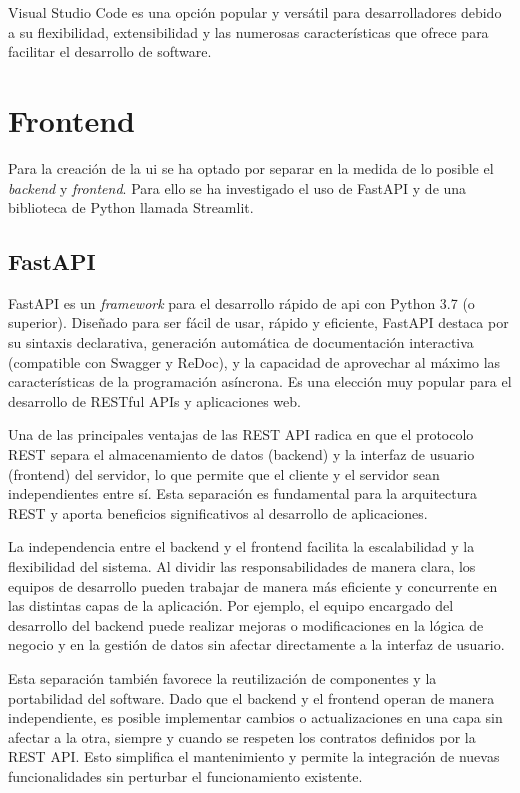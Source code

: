 Visual Studio Code es una opción popular y versátil para desarrolladores debido a su flexibilidad, extensibilidad y las numerosas características que ofrece para facilitar el desarrollo de software.

\section{Frontend}

Para la creación de la \acrshort{ui} se ha optado por separar en la medida de lo posible el \textit{backend} y \textit{frontend}. Para ello se ha investigado el uso de FastAPI y de una biblioteca de Python llamada Streamlit.

\subsection{FastAPI}

FastAPI es un \textit{framework} para el desarrollo rápido de \acrshort{api} con Python 3.7 (o superior). Diseñado para ser fácil de usar, rápido y eficiente, FastAPI destaca por su sintaxis declarativa, generación automática de documentación interactiva (compatible con Swagger y ReDoc), y la capacidad de aprovechar al máximo las características de la programación asíncrona. Es una elección muy popular para el desarrollo de RESTful APIs y aplicaciones web.

Una de las principales ventajas de las REST API radica en que el protocolo REST separa el almacenamiento de datos (backend) y la interfaz de usuario (frontend) del servidor, lo que permite que el cliente y el servidor sean independientes entre sí. Esta separación es fundamental para la arquitectura REST y aporta beneficios significativos al desarrollo de aplicaciones.

La independencia entre el backend y el frontend facilita la escalabilidad y la flexibilidad del sistema. Al dividir las responsabilidades de manera clara, los equipos de desarrollo pueden trabajar de manera más eficiente y concurrente en las distintas capas de la aplicación. Por ejemplo, el equipo encargado del desarrollo del backend puede realizar mejoras o modificaciones en la lógica de negocio y en la gestión de datos sin afectar directamente a la interfaz de usuario.

Esta separación también favorece la reutilización de componentes y la portabilidad del software. Dado que el backend y el frontend operan de manera independiente, es posible implementar cambios o actualizaciones en una capa sin afectar a la otra, siempre y cuando se respeten los contratos definidos por la REST API. Esto simplifica el mantenimiento y permite la integración de nuevas funcionalidades sin perturbar el funcionamiento existente.

